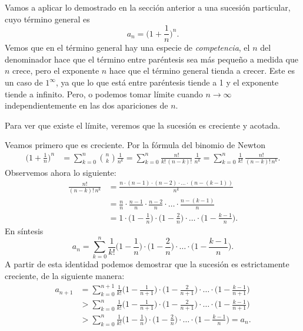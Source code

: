 Vamos a aplicar lo demostrado en la sección anterior a una sucesión particular, cuyo término general es
\[
a_n = \Big( 1 + \frac1n \Big)^n.
\]
Vemos que en el término general hay una especie de \emph{competencia}, el $n$ del denominador hace que el término entre paréntesis sea más pequeño a medida que $n$ crece, pero el exponente $n$ hace que el término general tienda a crecer. 
Este es un caso de $1^\infty$, ya que lo que está entre paréntesis tiende a 1 y el exponente tiende a infinito.
Pero, o podemos tomar límite cuando $n\to\infty$ independientemente en las dos apariciones de $n$. 

Para ver que existe el límite, veremos que la sucesión es creciente y acotada.

Veamos primero que es creciente. Por la fórmula del binomio de Newton
\begin{align*}
\Big( 1 + \frac1n \Big)^n
&= \sum_{k=0}^n \binom{n}{k} \frac{1}{n^k} 
= \sum_{k=0}^n \frac{n!}{k!\, (n-k)!} \,\frac{1}{n^k} 
= \sum_{k=0}^n \frac{1}{k!} \, \frac{n!}{ (n-k)! \, n^k} .
\end{align*}
Observemos ahora lo siguiente:
\begin{align*}
\frac{n!}{ (n-k)! \, n^k} 
&= \frac{n \cdot (n-1) \cdot (n-2)  \cdot \dots \cdot (n-(k-1))}{n^k} 
\\
&= \frac{n}{n} \cdot \frac{n-1}{n} \cdot \frac{n-2}n \cdot \dots \cdot \frac{n-(k-1)}{n} 
\\
&= 1 \cdot \Big(1-\frac1n\Big) \cdot \Big(1-\frac2n\Big)  \cdot  \dots \cdot \Big(1-\frac{k-1}n\Big).
\end{align*}
En síntesis
\begin{equation}\label{an para e}
    a_n = \sum_{k=0}^{n} \frac{1}{k!} \Big(1-\frac1{n}\Big) \cdot \Big(1-\frac2{n}\big)  \cdot  \dots \cdot \Big(1-\frac{k-1}{n}\Big).
\end{equation}
A partir de esta identidad podemos demostrar que la sucesión es estrictamente creciente, de la siguiente manera:
\begin{align*}
    a_{n+1} 
    &= \sum_{k=0}^{n+1} \frac{1}{k!} \Big(1-\frac1{n+1}\Big) \cdot \Big(1-\frac2{n+1}\Big)  \cdot  \dots \cdot \big(1-\frac{k-1}{n+1}\Big) 
    \\
    &> \sum_{k=0}^{n} \frac{1}{k!} \Big(1-\frac1{n+1}\Big) \cdot \big(1-\frac2{n+1}\Big)  \cdot  \dots \cdot \Big(1-\frac{k-1}{n+1}\Big) 
    \\
    &> \sum_{k=0}^{n} \frac{1}{k!} \Big(1-\frac1{n}\Big) \cdot \Big(1-\frac2{n}\Big)  \cdot  \dots \cdot \Big(1-\frac{k-1}{n}\Big)  
    = a_n.
\end{align*}
